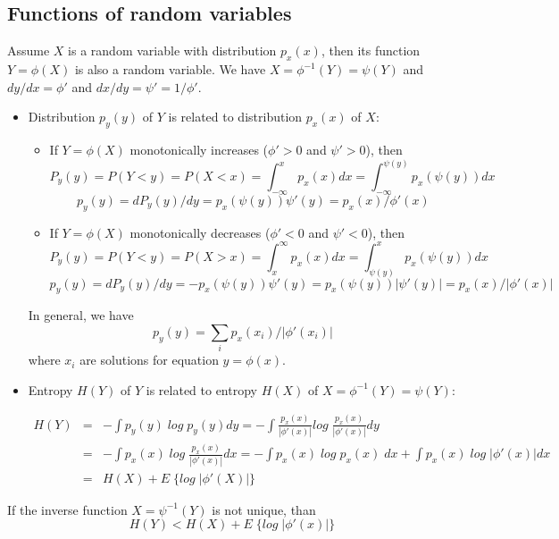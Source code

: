 \subsection*{Functions of random variables}

Assume $X$ is a random variable with distribution $p_x(x)$, then its function
$Y=\phi(X)$ is also a random variable. We have $X=\phi^{-1}(Y)=\psi(Y)$
and $dy/dx=\phi'$ and $dx/dy=\psi'=1/\phi'$.

\begin{itemize}
\item Distribution $p_y(y)$ of $Y$ is related to distribution $p_x(x)$ of $X$:

\begin{itemize}
\item If $Y=\phi(X)$ monotonically increases ($\phi'>0$ and $\psi'>0$), then
\[ P_y(y)=P(Y<y)=P(X<x)=\int_{-\infty}^x p_x(x)dx
	=\int_{-\infty}^{\psi(y)} p_x(\psi(y))dx	\]
\[ p_y(y)=dP_y(y)/dy=p_x(\psi(y))\psi'(y)=p_x(x)/\phi'(x)	\]
\item If $Y=\phi(X)$ monotonically decreases ($\phi'<0$ and $\psi'<0$), then
\[ P_y(y)=P(Y<y)=P(X>x)=\int_x^{\infty} p_x(x)dx
	=\int_{\psi(y)}^x p_x(\psi(y))dx	\]
\[ p_y(y)=dP_y(y)/dy=-p_x(\psi(y))\psi'(y)=p_x(\psi(y))|\psi'(y)|=p_x(x)/|\phi'(x)| \]
\end{itemize}
In general, we have
\[	p_y(y)=\sum_i p_x(x_i)/|\phi'(x_i)| \]
where $x_i$ are solutions for equation $y=\phi(x)$.

\item Entropy $H(Y)$ of $Y$ is related to entropy $H(X)$ of
$X=\phi^{-1}(Y)=\psi(Y)$:

\begin{eqnarray}
 H(Y) &=& -\int p_y(y) \; log \; p_y(y) dy
	=-\int \frac{p_x(x)}{|\phi'(x)|} log \; \frac{p_x(x)}{|\phi'(x)|} dy
	\nonumber \\
	&=&-\int p_x(x) \; log \; \frac{p_x(x)}{|\phi'(x)|} dx
	=-\int p_x(x) \; log \; p_x(x) \; dx+\int p_x(x)\; log \; |\phi'(x)| dx
	\nonumber \\
	&=&H(X)+E\; \{log\;|\phi'(X)|\}
	\nonumber	\end{eqnarray}

\end{itemize}
If the inverse function $X=\psi^{-1}(Y)$ is not unique, than
\[	H(Y)<H(X)+E\; \{log\;|\phi'(x)|\}	\]

